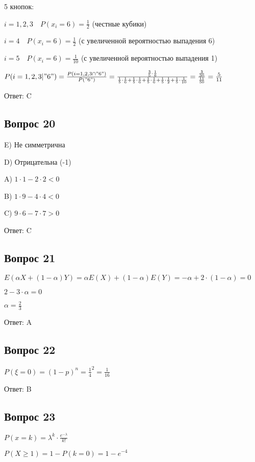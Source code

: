 \documentclass{article}
\begin{document}
\begin{flushleft}
5 кнопок:

$i=1,2,3 \quad P(x_i = 6) =\frac{1}{2}$ (честные кубики)

$i=4 \quad P(x_i = 6) =\frac{1}{2}$ (с увеличенной вероятностью выпадения 6)

$i=5 \quad P(x_i = 6) =\frac{1}{10}$ (с увеличенной вероятностью выпадения 1)

$P(i=1,2,3| "6") = \frac{P(i=1,2,3\cap "6")}{P("6")} = \frac{\frac{3}{5}\cdot \frac{1}{6}}{\frac{1}{5}\cdot \frac{1}{6} + \frac{1}{5}\cdot \frac{1}{6} + \frac{1}{5}\cdot \frac{1}{6} + \frac{1}{5}\cdot \frac{1}{2} + \frac{1}{5}\cdot \frac{1}{10}} = \frac{\frac{3}{30}}{\frac{11}{50}} = \frac{5}{11} $

Ответ: C

\subsection{Вопрос 20}


E) Не симметрична

D) Отрицательна (-1)

A) $1\cdot1 - 2\cdot2 < 0$

B) $1\cdot9 - 4\cdot4 < 0$

C) $9\cdot6 - 7\cdot7 > 0$

Ответ: C

\subsection{Вопрос 21}

$E(\alpha X + (1 - \alpha)Y) = \alpha E(X) + (1-\alpha) E(Y) = -\alpha + 2\cdot(1-\alpha) = 0$

$2 - 3\cdot\alpha = 0$

$\alpha = \frac{2}{3}$

Ответ: A

\subsection{Вопрос 22}

$P(\xi = 0) = (1-p)^n = \frac{1}{4}^2 = \frac{1}{16}$

Ответ: B

\subsection{Вопрос 23}

$P(x=k) = \lambda^k\cdot\frac{e^{-\lambda}}{k!}$

$P(X\geq1) = 1 - P(k=0) = 1 - e^{-4}$


\end{flushleft}
\end{document}
